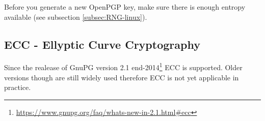 
Before you generate a new OpenPGP key, make sure there is enough entropy available (see subsection \ref{subsec:RNG-linux}).

\subsection{ECC - Ellyptic Curve Cryptography}
Since the realease of GnuPG version 2.1 end-2014\footnote{\url{https://www.gnupg.org/faq/whats-new-in-2.1.html#ecc}} ECC is supported. Older versions though are still widely used therefore ECC is not yet applicable in practice. 












